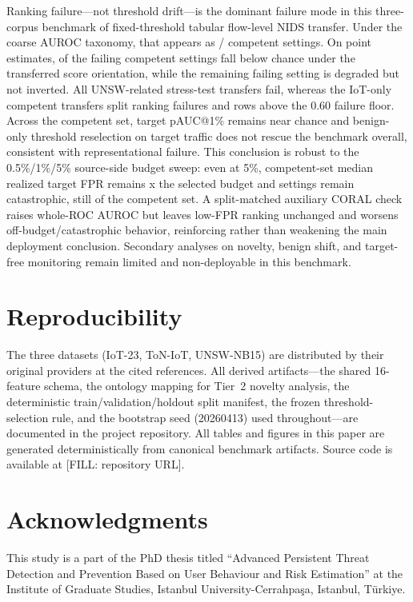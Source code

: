 \documentclass[10pt,conference]{IEEEtran}
\begin{document}
Ranking failure---not threshold drift---is the dominant failure mode in this three-corpus benchmark of fixed-threshold tabular flow-level NIDS transfer. Under the coarse AUROC taxonomy, that appears as \CompetentRankingFailureCount{}/\CompetentSettingCount{} competent settings. On point estimates, \CompetentInversionCount{} of the failing competent settings fall below chance under the transferred score orientation, while the remaining failing setting is degraded but not inverted. All \CompetentUnswStressTestSettingCount{} UNSW-related stress-test transfers fail, whereas the \CompetentIotOnlySettingCount{} IoT-only competent transfers split \CompetentIotOnlyRankingFailureCount{} ranking failures and \CompetentIotOnlyNonCollapsedCount{} rows above the 0.60 failure floor. Across the competent set, target pAUC@1\% remains near chance and benign-only threshold reselection on target traffic does not rescue the benchmark overall, consistent with representational failure. This conclusion is robust to the 0.5\%/1\%/5\% source-side budget sweep: even at 5\%, competent-set median realized target FPR remains \BudgetFivePctCompetentMedianBudgetMultiple{}x the selected budget and \BudgetFivePctCompetentCatastrophicCount{} settings remain catastrophic, still \BudgetFivePctCompetentCatastrophicShare{} of the competent set. A split-matched auxiliary CORAL check raises whole-ROC AUROC but leaves low-FPR ranking unchanged and worsens off-budget/catastrophic behavior, reinforcing rather than weakening the main deployment conclusion. Secondary analyses on novelty, benign shift, and target-free monitoring remain limited and non-deployable in this benchmark.

\FloatBarrier

\section*{Reproducibility}

The three datasets (IoT-23, ToN-IoT, UNSW-NB15) are distributed by their original providers at the cited references. All derived artifacts---the shared 16-feature schema, the ontology mapping for Tier~2 novelty analysis, the deterministic train/validation/holdout split manifest, the frozen threshold-selection rule, and the bootstrap seed (20260413) used throughout---are documented in the project repository. All tables and figures in this paper are generated deterministically from canonical benchmark artifacts. Source code is available at [FILL: repository URL].

\section*{Acknowledgments}

This study is a part of the PhD thesis titled ``Advanced Persistent Threat Detection and Prevention Based on User Behaviour and Risk Estimation'' at the Institute of Graduate Studies, Istanbul University-Cerrahpa\c{s}a, Istanbul, T\"urkiye.



\end{document}
